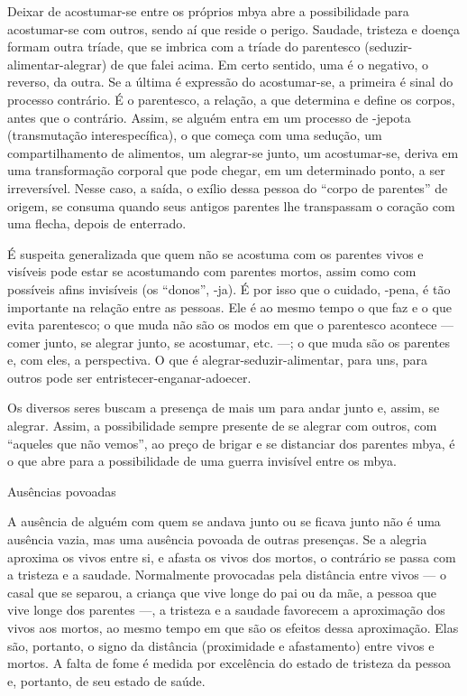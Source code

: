 \documentclass{article}
\begin{document}
Deixar de acostumar-se entre os pr\'oprios mbya abre a possibilidade
para acostumar-se com outros, sendo a\'i que reside o perigo. Saudade,
tristeza e doen\c{c}a formam outra tr\'iade, que se imbrica com a
tr\'iade do parentesco (seduzir-alimentar-alegrar) de que falei acima.
Em certo sentido, uma \'e o negativo, o reverso, da outra. Se a
\'ultima \'e express\~ao do acostumar-se, a primeira \'e sinal do
processo contr\'ario. \'E o parentesco, a rela\c{c}\~ao, a que
determina e define os corpos, antes que o contr\'ario. Assim, se
algu\'em entra em um processo de -jepota (transmuta\c{c}\~ao
interespec\'ifica), o que come\c{c}a com uma sedu\c{c}\~ao, um
compartilhamento de alimentos, um alegrar-se junto, um acostumar-se,
deriva em uma transforma\c{c}\~ao corporal que pode chegar, em um
determinado ponto, a ser irrevers\'ivel. Nesse caso, a sa\'ida, o
ex\'ilio dessa pessoa do {\textquotedblleft}corpo de
parentes{\textquotedblright} de origem, se consuma quando seus antigos
parentes lhe transpassam o cora\c{c}\~ao  com uma flecha, depois de
enterrado. 

\'E suspeita generalizada que quem n\~ao se acostuma com os parentes
vivos e vis\'iveis pode estar se acostumando com parentes mortos, assim
como com poss\'iveis afins invis\'iveis (os
{\textquotedblleft}donos{\textquotedblright}, -ja). \'E por isso que o
cuidado, -pena, \'e t\~ao importante na rela\c{c}\~ao entre as pessoas.
Ele \'e ao mesmo tempo o que faz e o que evita parentesco; o que muda
n\~ao s\~ao os modos em que o parentesco acontece --- comer junto, se
alegrar junto, se acostumar, etc. ---; o que muda s\~ao os parentes e,
com eles, a perspectiva. O que \'e alegrar-seduzir-alimentar, para uns,
para outros pode ser entristecer-enganar-adoecer. 

Os diversos seres buscam a presen\c{c}a de mais um para andar junto e,
assim, se alegrar. Assim, a possibilidade sempre presente de se alegrar
com outros, com {\textquotedblleft}aqueles que n\~ao
vemos{\textquotedblright}, ao pre\c{c}o de brigar e se distanciar dos
parentes mbya, \'e o que abre para a possibilidade de uma guerra
invis\'ivel entre os mbya. 

Aus\^encias povoadas

A aus\^encia de algu\'em com quem se andava junto ou se ficava junto
n\~ao \'e uma aus\^encia vazia, mas uma aus\^encia povoada de outras
presen\c{c}as. Se a alegria aproxima os vivos entre si, e afasta os
vivos dos mortos, o contr\'ario se passa com a tristeza e a saudade.
Normalmente provocadas pela dist\^ancia entre vivos --- o casal que se
separou, a crian\c{c}a que vive longe do pai ou da m\~ae, a pessoa que
vive longe dos parentes ---, a tristeza e a saudade favorecem a
aproxima\c{c}\~ao dos vivos aos mortos, ao mesmo tempo em que s\~ao os
efeitos dessa aproxima\c{c}\~ao. Elas s\~ao, portanto, o signo da
dist\^ancia (proximidade e afastamento) entre vivos e mortos. A falta
de fome \'e medida por excel\^encia do estado de tristeza da pessoa e,
portanto, de seu estado de sa\'ude. 
\end{document}

